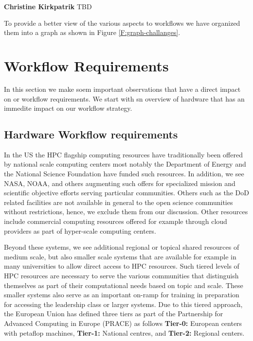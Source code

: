 \documentclass[utf8]{FrontiersinVancouver} %
\newcommand{\TODO}[1]{\todo[inline]{#1}}
\begin{document}
{\bf Christine Kirkpatrik} TBD
\TODO{Christine: add your workflow work here}

To provide a better view of the various aspects to workflows we have organized them into a graph as shown in Figure \ref{F:graph-challanges}.




\section{Workflow Requirements}

In this section we make soem important observations that have a direct impact on or workflow requirements. We start with sn overview of hardware that has an immedite impact on our workflow strategy.

\subsection{Hardware Workflow requirements}\label{sec:hw-requirements}

In the US the HPC flagship computing resources have traditionally been offered by national scale computing centers most notably the Department of Energy and the National Science Foundation have funded such resources. In addition, we see NASA, NOAA, and others augmenting such offers for specialized mission and scientific objective efforts serving particular communities. Others such as the DoD related facilities are not available in general to the open science communities without restrictions, hence, we exclude them from our discussion. Other resources include commercial computing resources offered for example through cloud
providers as part of hyper-scale computing centers.

Beyond these systems, we see additional regional or topical shared resources of medium scale, but also smaller scale systems that are available for example in many universities to allow direct access to HPC resources. Such tiered levels of HPC resources are necessary to serve the various communities that distinguish themselves as part of their computational needs based on topic and scale. These smaller systems also serve as an important on-ramp for training in preparation for accessing the leadership class or larger systems.  Due to this tiered approach, the European Union has defined three tiers as part of the Partnership for Advanced Computing in Europe (PRACE) \cite{www-prace,prace-fact} as follows {\bf Tier-0:} European centers with petaflop machines, {\bf Tier-1:} National centres, and {\bf Tier-2:} Regional centers.
  
\end{document}
